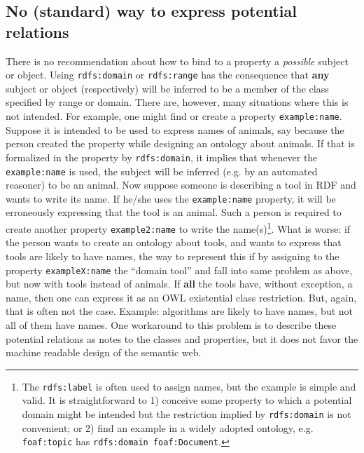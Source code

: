 \documentclass[12pt,fleqn]{article}
\begin{document}
\subsection{No (standard) way to express potential relations}\label{sec:rel}
There is no recommendation about how to bind to a property a \emph{possible}
subject or object.
Using \texttt{rdfs:domain} or \texttt{rdfs:range} has the consequence that
\textbf{any} subject or object (respectively) will be inferred to be a member of the class specified by
range or domain.
There are, however, many situations where this is not intended.
For example, one might find or create a property \texttt{example:name}.
Suppose it is intended to be used to express names of animals,
say because the person created the property while designing an ontology about animals.
If that is formalized in the property by \texttt{rdfs:domain},
it implies that whenever the \texttt{example:name} is used, the subject
will be inferred (e.g. by an automated reasoner) to be an animal.
Now suppose someone is describing a tool in RDF and wants to write its name.
If he/she uses the \texttt{example:name} property, it will be erroneously
expressing that the tool is an animal.
Such a person is required to create another property \texttt{example2:name}
to write the name(s)\footnote{The \texttt{rdfs:label} is often used to assign names,
but the example is simple and valid.
It is straightforward to 1) conceive some property to which a potential domain might be intended
but the restriction implied by \texttt{rdfs:domain} is not convenient;
or 2) find an example in a widely adopted ontology, e.g. \texttt{foaf:topic}
has \texttt{rdfs:domain foaf:Document}.}.
What is worse: if the person wants to create an ontology about tools,
and wants to express that tools are likely to have names,
the way to represent this if by assigning to the property \texttt{exampleX:name} the ``domain tool''
and fall into same problem
as above, but now with tools instead of animals.
If \textbf{all} the tools have, without exception, a name, then one can express
it as an OWL existential class restriction.
But, again, that is often not the case. Example: algorithms are likely to have names,
but not all of them have names.
One workaround to this problem is to describe these potential relations as notes to the
classes and properties, but it does not favor the machine readable design of the semantic web.
\end{document}
